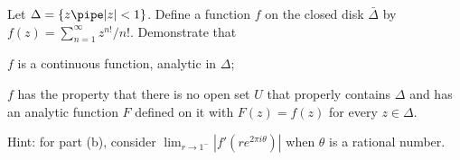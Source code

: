 Let $\Delta=\{z\pipe |z|<1\}$. Define a function $f$ on the closed
disk $\bar{\Delta}$ by
$f(z)=\sum_{n=1}^{\infty}z^{n!}/n!$. Demonstrate that
\begin{alist}
\item $f$ is a continuous function, analytic in $\Delta$;
\item $f$ has the property that there is no open set $U$ that properly
contains $\Delta$ and has an analytic function $F$ defined on it with
$F(z)=f(z)$ for every $z\in \Delta$. 
\end{alist}
Hint: for part (b), consider $\lim_{r\rightarrow 1^-}|f'(re^{2\pi
i\theta})|$ when $\theta$ is a rational number.
